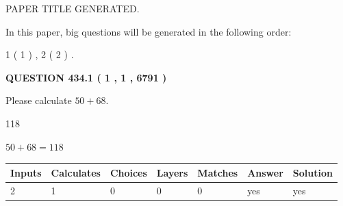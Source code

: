\documentclass[12pt]{article}
\begin{document}
   
   
   
   
   
 \vspace{0.2in}
 
 
 
 
   
   
 PAPER TITLE GENERATED.
   
   
   
\vspace{0.2in}
   
In this paper, big questions will be generated in the following order: 
   
   
   1 ( 1 )
 ,
   2 ( 2 )
 .
  
\vspace{0.2in}
  
{\textbf{\Large{QUESTION
434.1 
 ( 1 , 1 , 6791 )
}}}
  
  
 
Please calculate $ %
50 +  %
68 $.
 
 
 
\noindent{}
 
 

118
 
 
\noindent{}
 
 

 
 
 
\noindent{}
 
 

$ %
50 +  %
68=   %
118$
 
 
\noindent{}
 
 

 
   
   
   
   
\noindent\begin{tabular}{|l|l|l|l|l|l|l|}
 \hline
Inputs & Calculates & Choices & Layers & Matches & Answer & Solution \\ \hline
 2  & 
 1  & 
 0
  & 
 0  & 
 0  & 
  yes & 
  yes 
  \\ \hline
 \end{tabular}
   
   
   
   
\noindent{}
   
\end{document}
